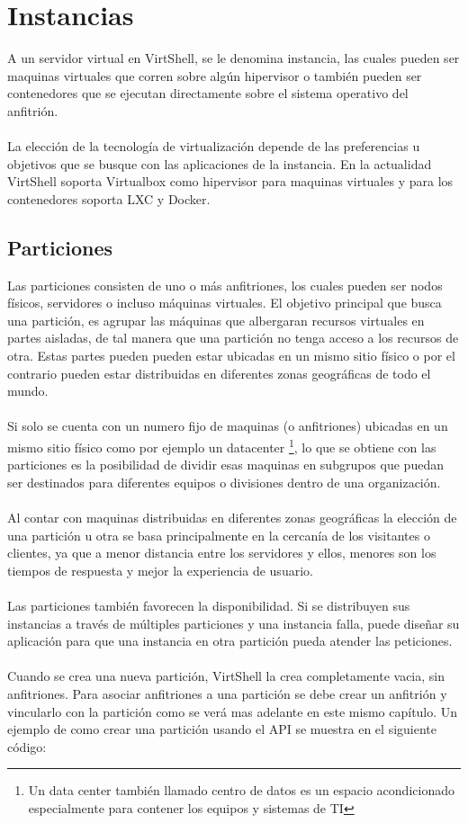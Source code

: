 \section{Instancias}
A un servidor virtual en VirtShell, se le denomina instancia, las cuales pueden ser maquinas virtuales que corren sobre algún hipervisor o también pueden ser contenedores que se ejecutan directamente sobre el sistema operativo del anfitrión. \\
\\
La elección de la tecnología de virtualización depende de las preferencias u objetivos que se busque con las aplicaciones de la instancia. En la actualidad VirtShell soporta Virtualbox como hipervisor para maquinas virtuales y para los contenedores soporta LXC y Docker.

\subsection{Particiones}
Las particiones consisten de uno o más anfitriones, los cuales pueden ser nodos físicos, servidores o incluso máquinas virtuales. El objetivo principal que busca una partición, es agrupar las máquinas que albergaran recursos virtuales en partes aisladas, de tal manera que una partición no tenga acceso a los recursos de otra. Estas partes pueden pueden estar ubicadas en un mismo sitio físico o por el contrario pueden estar distribuidas en diferentes zonas geográficas de todo el mundo.\\
\\
Si solo se cuenta con un numero fijo de maquinas (o anfitriones) ubicadas en un mismo sitio físico como por ejemplo un datacenter \footnote{Un data center también llamado centro de datos es un espacio acondicionado especialmente para contener los equipos y sistemas de TI}, lo que se obtiene con las particiones es la posibilidad de dividir esas maquinas en subgrupos que puedan ser destinados para diferentes equipos o divisiones dentro de una organización.\\ 
\\
Al contar con maquinas distribuidas en diferentes zonas geográficas la elección de una partición u otra se basa principalmente en la cercanía de los visitantes o clientes, ya que a menor distancia entre los servidores y ellos, menores son los tiempos de respuesta y mejor la experiencia de usuario.\\
\\
Las particiones también favorecen la disponibilidad. Si se distribuyen sus instancias a través de múltiples particiones y una instancia falla, puede diseñar su aplicación para que una instancia en otra partición pueda atender las peticiones.\\
\\
Cuando se crea una nueva partición, VirtShell la crea completamente vacia, sin anfitriones. Para asociar anfitriones a una partición se debe crear un anfitrión y vincularlo con la partición como se verá mas adelante en este mismo capítulo. Un ejemplo de como crear una partición usando el API se muestra en el siguiente código:

